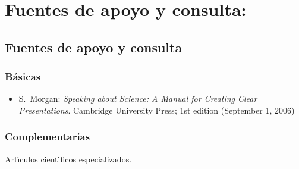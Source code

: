 \documentclass[10 pt]{article}
\begin{document}
\section{Fuentes de apoyo y consulta:}
\subsection{Fuentes de apoyo y consulta}
\subsubsection{B\'{a}sicas}

 \begin{itemize}[itemsep=0em]

 \item{S.\ {\sc Morgan}: {\em Speaking about Science: A Manual for
      Creating Clear Presentations}.
    Cambridge University Press; 1st edition (September 1, 2006)}
  
\end{itemize}

\subsubsection{Complementarias}

Art\'{\i}culos cient\'{\i}ficos especializados.

\label{final} %


\end{document}
